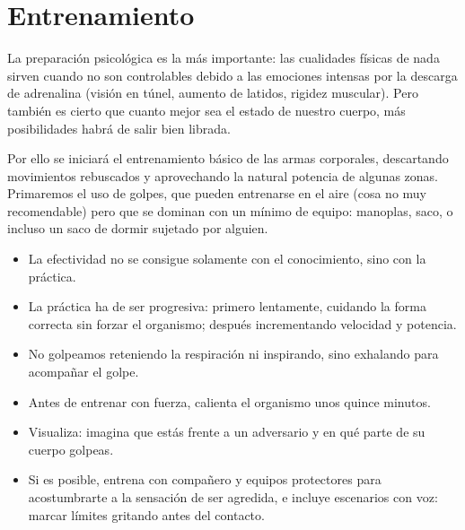 \chapter{Entrenamiento}

La preparación psicológica es la más importante: las cualidades físicas de nada sirven cuando no son controlables debido a las emociones intensas por la descarga de adrenalina (visión en túnel, aumento de latidos, rigidez muscular). Pero también es cierto que cuanto mejor sea el estado de nuestro cuerpo, más posibilidades habrá de salir bien librada.

Por ello se iniciará el entrenamiento básico de las armas corporales, descartando movimientos rebuscados y aprovechando la natural potencia de algunas zonas. Primaremos el uso de golpes, que pueden entrenarse en el aire (cosa no muy recomendable) pero que se dominan con un mínimo de equipo: manoplas, saco, o incluso un saco de dormir sujetado por alguien.

\begin{itemize}
  \item La efectividad no se consigue solamente con el conocimiento, sino con la práctica.
  \item La práctica ha de ser progresiva: primero lentamente, cuidando la forma correcta sin forzar el organismo; después incrementando velocidad y potencia.
  \item No golpeamos reteniendo la respiración ni inspirando, sino exhalando para acompañar el golpe.
  \item Antes de entrenar con fuerza, calienta el organismo unos quince minutos.
  \item Visualiza: imagina que estás frente a un adversario y en qué parte de su cuerpo golpeas.
  \item Si es posible, entrena con compañero y equipos protectores para acostumbrarte a la sensación de ser agredida, e incluye escenarios con voz: marcar límites gritando antes del contacto.
\end{itemize}
